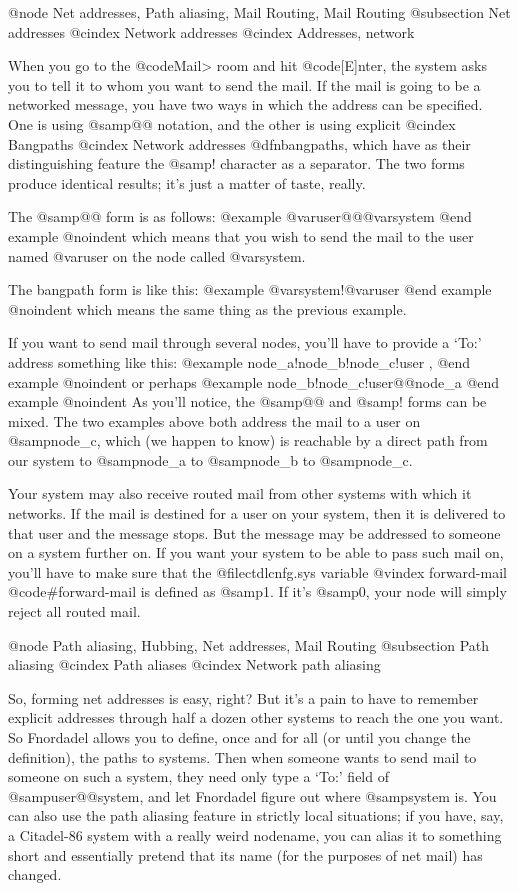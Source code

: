 {@node Net addresses, Path aliasing, Mail Routing, Mail Routing
@subsection Net addresses
@cindex Network addresses
@cindex Addresses, network

When you go to the @code{Mail>} room and hit @code{[E]nter}, the
system asks you to tell it to whom you want to send the mail.
If the mail is going to be a networked message, you have two
ways in which the address can be specified.  One is using @samp{@@}
notation, and the other is using explicit
@cindex Bangpaths
@cindex Network addresses
@dfn{bangpaths}, which
have as their distinguishing feature the @samp{!} character as a
separator.  The two forms produce identical results; it's just a
matter of taste, really.

The @samp{@@} form is as follows:
@example
@var{user}@@@var{system}
@end example
@noindent
which means that you wish to send the mail to the user
named @var{user} on the node called @var{system}.

The bangpath form is like this:
@example
@var{system}!@var{user}
@end example
@noindent
which means the same thing as the previous example.

If you want to send mail through several nodes, you'll
have to provide a `To:' address something like this:
@example
node_a!node_b!node_c!user ,
@end example
@noindent
or perhaps
@example
node_b!node_c!user@@node_a
@end example
@noindent
As you'll notice, the @samp{@@} and @samp{!} forms can be mixed.
The two examples above both address the mail to a user on
@samp{node_c}, which (we happen to know) is reachable by a direct
path from our system to @samp{node_a} to @samp{node_b} to @samp{node_c}.

Your system may also receive routed mail from other
systems with which it networks.  If the mail is destined for a
user on your system, then it is delivered to that user and the
message stops.  But the message may be addressed to someone on a
system further on.  If you want your system to be able to pass
such mail on, you'll have to make sure that the @file{ctdlcnfg.sys}
variable
@vindex forward-mail
@code{#forward-mail} is defined as @samp{1}.  If it's @samp{0}, your
node will simply reject all routed mail.

@node Path aliasing, Hubbing, Net addresses, Mail Routing
@subsection Path aliasing
@cindex Path aliases
@cindex Network path aliasing

So, forming net addresses is easy, right?  But it's a
pain to have to remember explicit addresses through half a dozen
other systems to reach the one you want.  So Fnordadel allows
you to define, once and for all (or until you change the
definition), the paths to systems.  Then when someone wants to
send mail to someone on such a system, they need only type a `To:'
field of @samp{user@@system}, and let Fnordadel figure out where
@samp{system} is.  You can also use the path aliasing feature in
strictly local situations; if you have, say, a Citadel-86 system
with a really weird nodename, you can alias it to something short
and essentially pretend that its name (for the purposes of net
mail) has changed.

}
